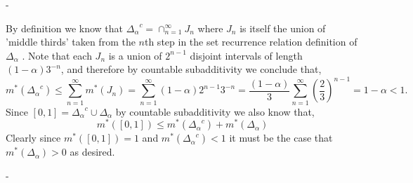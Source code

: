 \documentclass[12pt]{article}
\makeatletter
\theoremstyle{ex215}
\newcounter{probcount}
\newlength\probsep
\newlength\pshrinking
\newenvironment{problems}%
  {\ifhmode\unskip\par\fi\setcounter{probcount}{0}\probsep\parskip
  \sbox\@tempboxa{\textbf{9.}}\pshrinking\wd\@tempboxa\advance\pshrinking\labelsep
  \advance\linewidth -\pshrinking
  \advance\@totalleftmargin\pshrinking
  \advance\leftskip\pshrinking}%
  {\ifhmode\unskip \par\fi\advance\leftskip-\pshrinking}%
\renewenvironment{proof}[1][\proofname]{\par
  \pushQED{\qed}%
  \normalfont \topsep6\p@\@plus6\p@\relax
  \trivlist
  \@topsep \topsep
  \item[\hskip\labelsep
        \itshape
    #1\@addpunct{.}]\ignorespaces
}{%
  \popQED\endtrivlist\@endpefalse
}
\makeatother
\begin{document}
\begin{problems}
  \begin{proof} By definition we know that ${\Delta_{\alpha}}^c = \cap_{n = 1}^\infty J_n$ where $J_n$ is itself the union of 'middle thirds' taken from the $n$th step in the set recurrence relation definition of ${\Delta_{\alpha}}$ . Note that each $J_n$ is a union of $2^{n - 1}$ disjoint intervals of length $(1 - \alpha)3^{-n}$, and therefore by countable subadditivity we conclude that, 
    \begin{equation*}
      m^*({\Delta_{\alpha}}^c) \leq \sum_{n = 1}^{\infty} m^*(J_n) = \sum_{n = 1}^{\infty} (1 - \alpha)2^{n - 1}3^{-n} = \dfrac{(1 - \alpha)}{3}\sum_{n = 1}^{\infty}\left(\dfrac{2}{3}\right)^{n - 1} = 1 - \alpha < 1.
    \end{equation*}
    Since $[0, 1] = {\Delta_{\alpha}}^c \cup {\Delta_{\alpha}}$ by countable subadditivity we also know that,
    \begin{equation*}
      m^*([0, 1]) \leq m^*({\Delta_{\alpha}}^c) + m^*(\Delta_\alpha)
    \end{equation*}
    Clearly since $m^*([0, 1]) = 1$ and $m^*({\Delta_{\alpha}}^c) < 1$ it must be the case that $m^*(\Delta_\alpha) > 0$ as desired. 
    
  \end{proof}
  \vspace*{.15in}




\end{problems}
\end{document}
